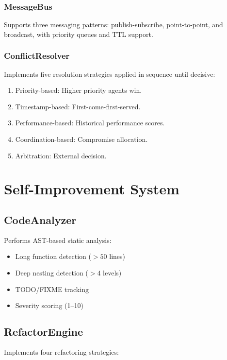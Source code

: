 \documentclass[11pt,a4paper]{article}
\begin{document}
\subsubsection{MessageBus}

Supports three messaging patterns: publish-subscribe, point-to-point, and broadcast, with priority queues and TTL support.

\subsubsection{ConflictResolver}

Implements five resolution strategies applied in sequence until decisive:

\begin{enumerate}
    \item Priority-based: Higher priority agents win.
    \item Timestamp-based: First-come-first-served.
    \item Performance-based: Historical performance scores.
    \item Coordination-based: Compromise allocation.
    \item Arbitration: External decision.
\end{enumerate}

\section{Self-Improvement System}

\subsection{CodeAnalyzer}

Performs AST-based static analysis:

\begin{itemize}
    \item Long function detection ($>50$ lines)
    \item Deep nesting detection ($>4$ levels)
    \item TODO/FIXME tracking
    \item Severity scoring (1--10)
\end{itemize}

\subsection{RefactorEngine}

Implements four refactoring strategies:
\end{document}
